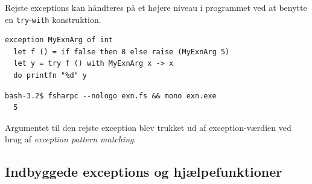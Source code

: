 \documentclass[rgb]{beamer}
\begin{document}
\begin{frame}[fragile]
\begin{footnotesize}


  Rejste exceptions kan håndteres på et højere niveau i programmet ved
  at benytte en \lstinline{try}-\lstinline{with} konstruktion.


\begin{lstlisting}[numbers=none,frame=none,mathescape]
  exception MyExnArg of int
  let f () = if false then 8 else raise (MyExnArg 5)
  let y = try f () with MyExnArg x -> x
  do printfn "%d" y
\end{lstlisting}

\vspace{1ex}

\begin{lstlisting}[numbers=none,frame=none]
  bash-3.2$ fsharpc --nologo exn.fs && mono exn.exe
  5
\end{lstlisting}


\vspace{1ex}
Argumentet til den rejste exception blev trukket ud af
exception-værdien ved brug af \emph{exception pattern matching}.
\end{footnotesize}
\end{frame}

\subsection{Indbyggede exceptions og hjælpefunktioner}
\end{document}
